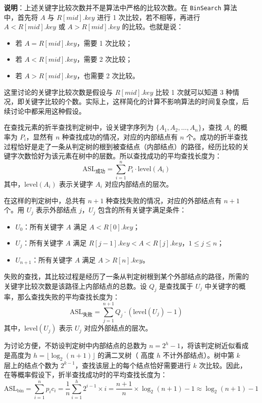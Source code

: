 \documentclass[lang=cn,newtx,10pt,scheme=chinese]{../elegantbook}
\begin{document}
\textbf{说明}：上述关键字比较次数并不是算法中严格的比较次数。在 \texttt{BinSearch} 算法中，首先将 $A$ 与 $R[mid].key$ 进行 1 次比较，若不相等，再进行 $A < R[mid].key$ 或 $A > R[mid].key$ 的比较。也就是说：
\begin{itemize}
  \item 若 $A = R[mid].key$，需要 1 次比较；
  \item 若 $A < R[mid].key$，需要 2 次比较；
  \item 若 $A > R[mid].key$，也需要 2 次比较。
\end{itemize}
这里讨论的关键字比较次数是假设与 $R[mid].key$ 比较 1 次就可以知道 3 种情况，即关键字比较的个数。实际上，这样简化的计算不影响算法的时间复杂度，后续讨论中都采用这种假设。



在查找元素的折半查找判定树中，设关键字序列为 $\{A_1, A_2, \dots, A_n\}$，查找 $A_i$ 的概率为 $P_i$，显然有 $n$ 种查找成功的情况，对应的内部结点有 $n$ 个。成功的折半查找过程恰好是走了一条从判定树的根到被查结点（内部结点）的路径，经历比较的关键字次数恰好为该元素在树中的层数。所以查找成功的平均查找长度为：
\[
\text{ASL}_{\text{成功}} = \sum_{i=1}^n P_i \cdot \text{level}(A_i)
\]
其中，$\text{level}(A_i)$ 表示关键字 $A_i$ 对应内部结点的层次。

在这样的判定树中，总共有 $n+1$ 种查找失败的情况，对应的外部结点有 $n+1$ 个。用 $U_j$ 表示外部结点 $j$，$U_j$ 包含的所有关键字满足条件：
\begin{itemize}
  \item $U_0$：所有关键字 $A$ 满足 $A < R[0].key$；
  \item $U_j$：所有关键字 $A$ 满足 $R[j-1].key < A < R[j].key$，$1 \leq j \leq n$；
  \item $U_{n+1}$：所有关键字 $A$ 满足 $A > R[n].key$。
\end{itemize}

失败的查找，其比较过程是经历了一条从判定树根到某个外部结点的路径，所需的关键字比较次数是该路径上内部结点的总数。设 $Q_j$ 是查找属于 $U_j$ 中关键字的概率，那么查找失败的平均查找长度为：
\[
\text{ASL}_{\text{失败}} = \sum_{j=1}^{n+1} Q_j \cdot (\text{level}(U_j) - 1)
\]
其中，$\text{level}(U_j)$ 表示 $U_j$ 对应外部结点的层次。


为讨论方便，不妨设判定树中内部结点的总数为 $n = 2^h - 1$，将该判定树近似看成是高度为 $h = \lfloor \log_2 (n+1) \rfloor$ 的满二叉树（
高度 $h$ 不计外部结点）。树中第 $k$ 层上的结点个数为 $2^{k-1}$，查找该层上的每个结点恰好需要进行 $k$ 次比较。因此，在等概率假设下，折半查找成功时的平均查找长度为：
\[
\text{ASL}_{\text{bin}} = \sum_{i=1}^{n} p_i c_i = \frac{1}{n} \sum_{i=1}^{h} 2^{i-1} \times i = \frac{n+1}{n} \times \log_2 (n+1) -1 \approx \log_2 (n+1) -1
\]
\end{document}
